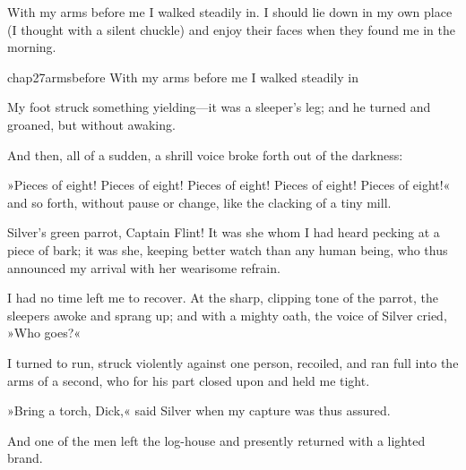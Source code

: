 With my arms before me I walked steadily in. I should lie down in my own place (I thought with a silent chuckle) and enjoy their faces when they found me in the morning.


\begin{bwbigpic}
	[\picsize]
	{chap27armsbefore}
	{With my arms before me I walked steadily in}
\end{bwbigpic}

My foot struck something yielding—it was a sleeper's leg; and he turned and groaned, but without awaking.

And then, all of a sudden, a shrill voice broke forth out of the darkness:

»Pieces of eight! Pieces of eight! Pieces of eight! Pieces of eight! Pieces of eight!« and so forth, without pause or change, like the clacking of a tiny mill.

Silver's green parrot, Captain Flint! It was she whom I had heard pecking at a piece of bark; it was she, keeping better watch than any human being, who thus announced my arrival with her wearisome refrain.

I had no time left me to recover. At the sharp, clipping tone of the parrot, the sleepers awoke and sprang up; and with a mighty oath, the voice of Silver cried, »Who goes?«

I turned to run, struck violently against one person, recoiled, and ran full into the arms of a second, who for his part closed upon and held me tight.

»Bring a torch, Dick,« said Silver when my capture was thus assured.

And one of the men left the log-house and presently returned with a lighted brand.